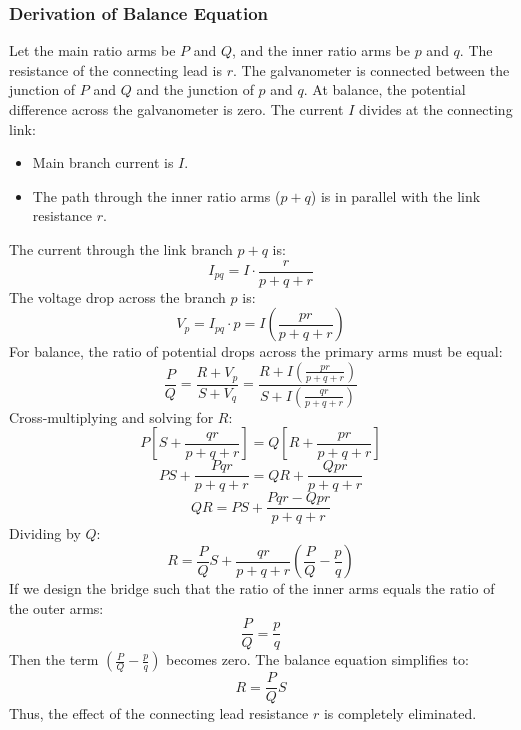 \documentclass[12pt,a4paper]{article}
\begin{document}
\subsubsection{Derivation of Balance Equation}
Let the main ratio arms be $P$ and $Q$, and the inner ratio arms be $p$ and $q$. The resistance of the connecting lead is $r$.
The galvanometer is connected between the junction of $P$ and $Q$ and the junction of $p$ and $q$. At balance, the potential difference across the galvanometer is zero.
The current $I$ divides at the connecting link:
\begin{itemize}[leftmargin=*, itemsep=3pt]
  \item Main branch current is $I$.
  \item The path through the inner ratio arms ($p+q$) is in parallel with the link resistance $r$.
\end{itemize}
The current through the link branch $p+q$ is:
\begin{equation}
  I_{pq} = I \cdot \frac{r}{p + q + r}
\end{equation}
The voltage drop across the branch $p$ is:
\begin{equation}
  V_p = I_{pq} \cdot p = I \left( \frac{p r}{p + q + r} \right)
\end{equation}
For balance, the ratio of potential drops across the primary arms must be equal:
\begin{equation}
  \frac{P}{Q} = \frac{R + V_p}{S + V_q} = \frac{R + I \left(\frac{p r}{p + q + r}\right)}{S + I \left(\frac{q r}{p + q + r}\right)}
\end{equation}
Cross-multiplying and solving for $R$:
\begin{equation}
  P \left[ S + \frac{q r}{p + q + r} \right] = Q \left[ R + \frac{p r}{p + q + r} \right]
\end{equation}
\begin{equation}
  P S + \frac{P q r}{p + q + r} = Q R + \frac{Q p r}{p + q + r}
\end{equation}
\begin{equation}
  Q R = P S + \frac{P q r - Q p r}{p + q + r}
\end{equation}
Dividing by $Q$:
\begin{equation}
  R = \frac{P}{Q} S + \frac{q r}{p + q + r} \left( \frac{P}{Q} - \frac{p}{q} \right)
\end{equation}
If we design the bridge such that the ratio of the inner arms equals the ratio of the outer arms:
\begin{equation}
  \frac{P}{Q} = \frac{p}{q}
\end{equation}
Then the term $\left(\frac{P}{Q} - \frac{p}{q}\right)$ becomes zero. The balance equation simplifies to:
\begin{equation}
  R = \frac{P}{Q} S
\end{equation}
Thus, the effect of the connecting lead resistance $r$ is completely eliminated.
\end{document}
